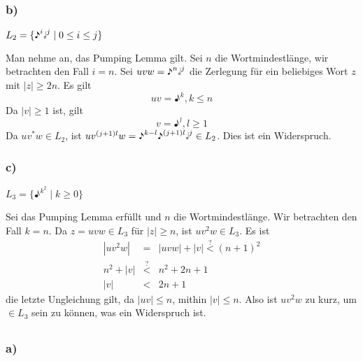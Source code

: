 \documentclass{article}
\begin{document}
   \subsubsection{b)}
   
   \begin{center}
      $L_2 = \{\eighthnote^i\halfnote^j \mid 0 \le i \le j\}$
   \end{center}

   Man nehme an, das Pumping Lemma gilt. Sei $n$ die Wortmindestl\"ange, wir
   betrachten den Fall $i = n$. Sei $uvw = \eighthnote^n\halfnote^j$ die
   Zerlegung f\"ur ein beliebiges Wort $z$ mit $|z|\ge 2n$. Es gilt
   \begin{equation*}
      uv = \eighthnote^k, k \le n
   \end{equation*}
   Da $|v| \ge 1$ ist, gilt
   \begin{equation*}
      v = \eighthnote^l, l \ge 1
   \end{equation*}
   Da $uv^*w \in L_2$, ist $uv^{(j+1)l}w =
   \eighthnote^{k-l}\eighthnote^{(j+1)l}\halfnote^j\in L_2$. Dies ist ein
   Widerspruch.

   \subsubsection{c)}

   \begin{center}
      $L_3 = \{\eighthnote^{k^2} \mid k \ge 0\}$
   \end{center}

   Sei das Pumping Lemma erf\"ullt und $n$ die Wortmindestl\"ange. Wir
   betrachten den Fall $k = n$. Da $z =
   uvw \in L_3$ f\"ur $|z| \ge n$, ist $uv^2w \in L_3$. Es ist
   \begin{eqnarray*}
      |uv^2w| & = & |uvw| + |v| \stackrel{?}{<} (n+1)^2 \\
      n^2 + |v| & \stackrel{?}{<} & n^2 +2n + 1 \\
      |v| & < & 2n+1
   \end{eqnarray*}
   die letzte Ungleichung gilt, da $|uv| \le n$, mithin $|v| \le n$. Also ist
   $uv^2w$ zu kurz, um $\in L_3$ sein zu können, was ein Widerspruch ist.

   \subsection{} 

   \subsubsection{a)}
\end{document}
